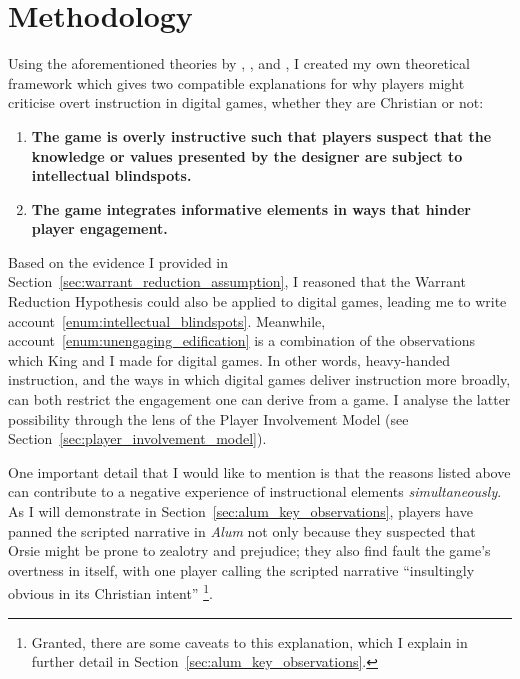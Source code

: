 \chapter{Methodology} \label{ch:methodology}


Using the aforementioned theories by \textcite{repp_whats_2012}, \textcite{king_virtue_2017}, and \textcite{calleja_in_game_2011}, I created my own theoretical framework which gives two compatible explanations for why players might criticise overt instruction in digital games, whether they are Christian or not:

\begin{enumerate}[label=\Alph*]
	\item \textbf{The game is overly instructive such that players suspect that the knowledge or values presented by the designer are subject to intellectual blindspots.} \label{enum:intellectual_blindspots}
	\item \textbf{The game integrates informative elements in ways that hinder player engagement.} \label{enum:unengaging_edification}
\end{enumerate}

Based on the evidence I provided in Section~\ref{sec:warrant_reduction_assumption}, I reasoned that the Warrant Reduction Hypothesis could also be applied to digital games, leading me to write account~\ref{enum:intellectual_blindspots}. Meanwhile, account~\ref{enum:unengaging_edification} is a combination of the observations which King and I made for digital games. In other words, heavy-handed instruction, and the ways in which digital games deliver instruction more broadly, can both restrict the engagement one can derive from a game. I analyse the latter possibility through the lens of the Player Involvement Model (see Section~\ref{sec:player_involvement_model}).

One important detail that I would like to mention is that the reasons listed above can contribute to a negative experience of instructional elements \textit{simultaneously}. As I will demonstrate in Section~\ref{sec:alum_key_observations}, players have panned the scripted narrative in \textit{Alum} \parencite{orsie_alum_2006} not only because they suspected that Orsie might be prone to zealotry and prejudice; they also find fault the game's overtness in itself, with one player calling the scripted narrative ``insultingly obvious in its Christian intent'' \parencite[para. 1]{speedkillsuk_review_2017}\footnote{Granted, there are some caveats to this explanation, which I explain in further detail in Section~\ref{sec:alum_key_observations}.}.

